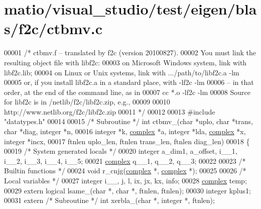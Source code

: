 \hypertarget{matio_2visual__studio_2test_2eigen_2blas_2f2c_2ctbmv_8c_source}{}\section{matio/visual\+\_\+studio/test/eigen/blas/f2c/ctbmv.c}
\label{matio_2visual__studio_2test_2eigen_2blas_2f2c_2ctbmv_8c_source}

\begin{DoxyCode}
00001 \textcolor{comment}{/* ctbmv.f -- translated by f2c (version 20100827).}
00002 \textcolor{comment}{   You must link the resulting object file with libf2c:}
00003 \textcolor{comment}{    on Microsoft Windows system, link with libf2c.lib;}
00004 \textcolor{comment}{    on Linux or Unix systems, link with .../path/to/libf2c.a -lm}
00005 \textcolor{comment}{    or, if you install libf2c.a in a standard place, with -lf2c -lm}
00006 \textcolor{comment}{    -- in that order, at the end of the command line, as in}
00007 \textcolor{comment}{        cc *.o -lf2c -lm}
00008 \textcolor{comment}{    Source for libf2c is in /netlib/f2c/libf2c.zip, e.g.,}
00009 \textcolor{comment}{}
00010 \textcolor{comment}{        http://www.netlib.org/f2c/libf2c.zip}
00011 \textcolor{comment}{*/}
00012 
00013 \textcolor{preprocessor}{#include "datatypes.h"}
00014 
00015 \textcolor{comment}{/* Subroutine */} \textcolor{keywordtype}{int} ctbmv\_(\textcolor{keywordtype}{char} *uplo, \textcolor{keywordtype}{char} *trans, \textcolor{keywordtype}{char} *diag, integer *n, 
00016     integer *k, \hyperlink{structcomplex}{complex} *a, integer *lda, \hyperlink{structcomplex}{complex} *x, integer *incx, 
00017     ftnlen uplo\_len, ftnlen trans\_len, ftnlen diag\_len)
00018 \{
00019     \textcolor{comment}{/* System generated locals */}
00020     integer a\_dim1, a\_offset, i\_\_1, i\_\_2, i\_\_3, i\_\_4, i\_\_5;
00021     \hyperlink{structcomplex}{complex} q\_\_1, q\_\_2, q\_\_3;
00022 
00023     \textcolor{comment}{/* Builtin functions */}
00024     \textcolor{keywordtype}{void} r\_cnjg(\hyperlink{structcomplex}{complex} *, \hyperlink{structcomplex}{complex} *);
00025 
00026     \textcolor{comment}{/* Local variables */}
00027     integer i\_\_, j, l, ix, jx, kx, info;
00028     \hyperlink{structcomplex}{complex} temp;
00029     \textcolor{keyword}{extern} logical lsame\_(\textcolor{keywordtype}{char} *, \textcolor{keywordtype}{char} *, ftnlen, ftnlen);
00030     integer kplus1;
00031     \textcolor{keyword}{extern} \textcolor{comment}{/* Subroutine */} \textcolor{keywordtype}{int} xerbla\_(\textcolor{keywordtype}{char} *, integer *, ftnlen);

\end{DoxyCode}
